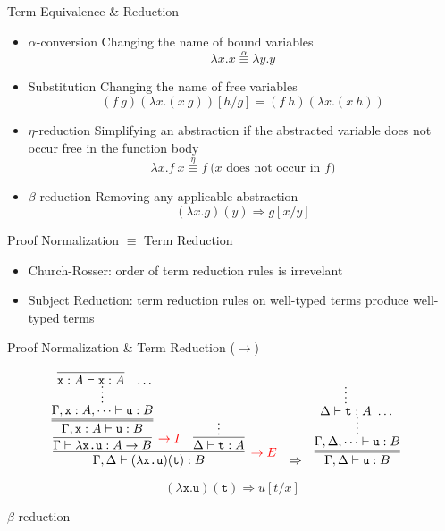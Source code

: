 \documentclass{beamer}
\newcommand{\term}[1]{\texttt{#1}}
\begin{document}
\begin{frame}{Term Equivalence \& Reduction}
	\small 
	
	\begin{itemize}
		\item \alert{$\alpha$-conversion} Changing the name of bound variables
		\[
			\lambda x.x \stackrel{\alpha}{\equiv} \lambda y.y
		\]
		\item \alert{Substitution} Changing the name of free variables
		\[
			(f\  g)(\lambda x.(x \ g))[h/g] = (f\ h)(\lambda x.(x \ h))	
		\]
		\item \alert{$\eta$-reduction} Simplifying an abstraction if the abstracted variable does not occur free in the function body
		\[
			\lambda x.f \ x \stackrel{\eta}{\equiv} f \ \text{($x$ does not occur in $f$)}
		\]
		\item \alert{$\beta$-reduction} Removing any applicable abstraction
		\[
			(\lambda x.g)(y) \Longrightarrow g[x/y]
		\]
	\end{itemize}
	
	\begin{block}{Proof Normalization $\equiv$ Term Reduction}
		\begin{itemize}
			\item Church-Rosser: order of term reduction rules is irrevelant
			\item Subject Reduction: term reduction rules on well-typed terms produce well-typed terms
		\end{itemize}
	\end{block}
\end{frame}

\begin{frame}{Proof Normalization \& Term Reduction ($\to$)}
	\small 
	
	\[
		\begin{array}[t]{@{}ccc}
			\infer[\textcolor{red}{\to E}]{\Gamma, \Delta \vdash (\lambda\term{x.u})(\term{t}): B}{
				\infer[\textcolor{red}{\to I}]{\Gamma \vdash \lambda\term{x.u}: A \to B}{
					\infer=[]{\Gamma, \term{x}: A \vdash \term{u}: B}{
						\infer*[]{\Gamma, \term{x}: A, \dots \vdash \term{u}: B}{
							\infer[]{\term{x}: A \vdash \term{x}: A}{}
							\
							\dots
						}
					}
				}
				&
				\infer[]{\Delta \vdash \term{t}: A}{\vdots}
			}		
			&
			\Rightarrow
			&
			\infer=[]{\Gamma, \Delta \vdash \term{u}: B}{
				\infer*[]{\Gamma, \Delta, \dots \vdash \term{u}: B}{
					\infer*[]{\Delta \vdash \term{t}: A}{}
					\
					\dots
				}
			}
		\end{array}
	\]	
	
	\alert{
	\[
		(\lambda\term{x.u})(\term{t}) \Longrightarrow u[t/x]
	\]
	}
	\begin{flushright}
		$\beta$-reduction
	\end{flushright}

\end{frame}
\end{document}
